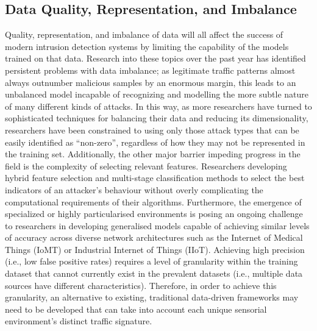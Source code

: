 \documentclass[12pt]{article}
\begin{document}
\subsection{Data Quality, Representation, and Imbalance}
Quality, representation, and imbalance of data will all affect the success of modern intrusion detection systems by limiting the capability of the models trained on that data. Research into these topics over the past year has identified persistent problems with data imbalance; as legitimate traffic patterns almost always outnumber malicious samples by an enormous margin, this leads to an unbalanced model incapable of recognizing and modelling the more subtle nature of many different kinds of attacks. In this way, as more researchers have turned to sophisticated techniques for balancing their data and reducing its dimensionality, researchers have been constrained to using only those attack types that can be easily identified as “non-zero”, regardless of how they may not be represented in the training set. Additionally, the other major barrier impeding progress in the field is the complexity of selecting relevant features. Researchers developing hybrid feature selection and multi-stage classification methods to select the best indicators of an attacker’s behaviour without overly complicating the computational requirements of their algorithms. Furthermore, the emergence of specialized or highly particularised environments is posing an ongoing challenge to researchers in developing generalised models capable of achieving similar levels of accuracy across diverse network architectures such as the Internet of Medical Things (IoMT) or Industrial Internet of Things (IIoT). Achieving high precision (i.e., low false positive rates) requires a level of granularity within the training dataset that cannot currently exist in the prevalent datasets (i.e., multiple data sources have different characteristics). Therefore, in order to achieve this granularity, an alternative to existing, traditional data-driven frameworks may need to be developed that can take into account each unique sensorial environment’s distinct traffic signature.
\end{document}
